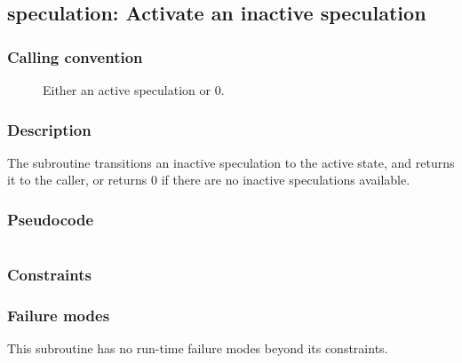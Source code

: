 \clearpage
{}
{}
\label{subr:speculation}
\subsection*{speculation: Activate an inactive speculation}

\subsubsection*{Calling convention}

\begin{description}
\item[] Either an active speculation or 0.
\end{description}

\subsubsection*{Description}

The  subroutine transitions an inactive
speculation to the active state, and returns it to the caller, or
returns 0 if there are no inactive speculations available.
\subsubsection*{Pseudocode}

\begin{verbatim}
\end{verbatim}

\subsubsection*{Constraints}

\subsubsection*{Failure modes}

This subroutine has no run-time failure modes beyond its constraints.
